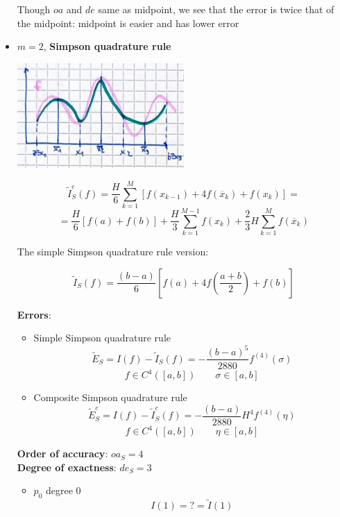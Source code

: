 \begin{itemize}
    Though $oa$ and $de$ same as midpoint, we see that the error is twice that of the midpoint: midpoint is easier and has lower error
    \item $m=2$, \textbf{Simpson quadrature rule}
    \begin{center}
        \includegraphics[width=0.5\textwidth]{images/quadrature_m2.png}
    \end{center}
    \begin{LARGE}
        $$
        \tilde{I}_{S}^c(f)=
        \frac{H}{6}
        \sum_{k=1}^M
        \left[
            f(x_{k-1})+4f(\overline{x}_k)+f(x_k)
        \right]=
        $$
        $$
        =
        \frac{H}{6}
        \left[f(a)+f(b)\right]+
        \frac{H}{3}
        \sum_{k=1}^{M-1}f(x_k)+
        \frac{2}{3}H
        \sum_{k=1}^{M}f(\overline{x}_k)
        $$
    \end{LARGE}
    The simple Simpson quadrature rule version:
    \begin{LARGE}
        $$
        \tilde{I}_S(f)=\frac{(b-a)}{6}\left[
            f(a)+
            4f\left(\frac{a+b}{2}\right)+f(b)
        \right]
        $$
    \end{LARGE}
    \textbf{Errors}:
    \begin{itemize}
        \item Simple Simpson quadrature rule
        $$
        \tilde{E}_S=I(f)-\tilde{I}_S(f)=
        -\frac{(b-a)^5}{2880}f^{(4)}(\sigma)
        $$
        $$
        f\in C^4([a,b])\qquad\sigma\in[a,b]
        $$
        \item Composite Simpson quadrature rule
        $$
        \tilde{E}_S^c=I(f)-\tilde{I}_S^c(f)=
        -\frac{(b-a)}{2880}H^4f^{(4)}(\eta)
        $$
        $$
        f\in C^4([a,b])\qquad\eta\in[a,b]
        $$
    \end{itemize}
    \textbf{Order of accuracy}: $oa_{S}=4$\\
    \textbf{Degree of exactness}: $de_{S}=3$
    \begin{itemize}
        \item $p_0$ degree 0
        $$I(1)=?=\tilde{I}(1)$$
        $$
$$
\end{itemize}
\end{itemize}
